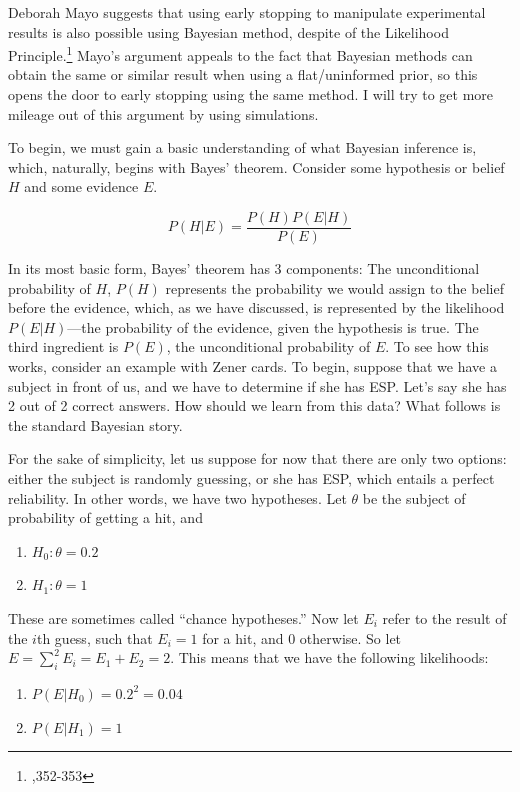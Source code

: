 Deborah Mayo suggests that using early stopping to manipulate experimental results is also possible using Bayesian method, despite of the Likelihood Principle.\footnote{\cite{errorgrowth},352-353} Mayo's argument appeals to the fact that Bayesian methods can obtain the same or similar result when using a flat/uninformed prior, so this opens the door to early stopping using the same method. I will try to get more mileage out of this argument by using simulations.

To begin, we must gain a basic understanding of what Bayesian inference is, which, naturally, begins with Bayes' theorem. Consider some hypothesis
or belief \(H\) and some evidence \(E\).

\[P(H|E) = \frac{P(H)P(E|H)}{P(E)}\]

In its most basic form, Bayes' theorem has 3 components: The
unconditional probability of \(H\), \(P(H)\) represents the probability
we would assign to the belief before the evidence, which, as we have
discussed, is represented by the likelihood \(P(E|H)\)---the probability
of the evidence, given the hypothesis is true. The third ingredient is
\(P(E)\), the unconditional probability of \(E\). To see how this works,
consider an example with Zener cards. To begin, suppose that we have a
subject in front of us, and we have to determine if she has ESP. Let's say
she has 2 out of 2 correct answers. How should we learn from this data?
What follows is the standard Bayesian story.

For the sake of simplicity, let us suppose for now that there are only
two options: either the subject is randomly guessing, or she has ESP,
which entails a perfect reliability. In other words, we have two
hypotheses. Let \(\theta\) be the subject of probability of getting a
hit, and

\begin{enumerate}
\def\labelenumi{\arabic{enumi}.}
\tightlist
\item
  \(H_0: \theta = 0.2\)
\item
  \(H_1: \theta = 1\)
\end{enumerate}

These are sometimes called ``chance hypotheses.'' Now let \(E_i\) refer
to the result of the \(i\)th guess, such that $E_i=1$ for a hit, and
\(0\) otherwise. So let \(E = \sum_i^2 E_i = E_1 + E_2 = 2\). This means
that we have the following likelihoods:

\begin{enumerate}
\def\labelenumi{\arabic{enumi}.}
\setcounter{enumi}{2}
\tightlist
\item
  \(P(E|H_0) = 0.2^2=0.04\)
\item
  \(P(E|H_1) = 1\)
\end{enumerate}

